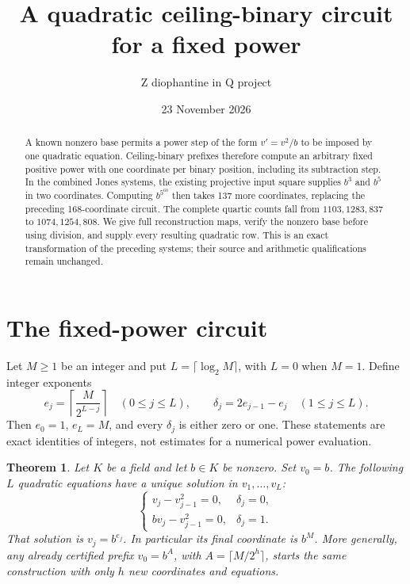 \documentclass[11pt]{article}
\title{A quadratic ceiling-binary circuit for a fixed power}
\author{Z diophantine in Q project}
\date{23 November 2026}
\newtheorem{theorem}{Theorem}
\begin{document}
\maketitle
\begin{abstract}
A known nonzero base permits a power step of the form
$v'=v^2/b$ to be imposed by one quadratic equation.  Ceiling-binary
prefixes therefore compute an arbitrary fixed positive power with one
coordinate per binary position, including its subtraction step.  In the
combined Jones systems, the existing projective input square supplies
$b^3$ and $b^5$ in two coordinates.  Computing $b^{5^{60}}$ then takes
137 more coordinates, replacing the preceding 168-coordinate circuit.
The complete quartic counts fall from $1103,1283,837$ to
$1074,1254,808$.  We give full reconstruction maps, verify the nonzero
base before using division, and supply every resulting quadratic row.
This is an exact transformation of the preceding systems; their source
and arithmetic qualifications remain unchanged.
\end{abstract}

\section{The fixed-power circuit}

Let $M\ge1$ be an integer and put $L=\lceil\log_2 M\rceil$, with
$L=0$ when $M=1$.  Define integer exponents
\[
 e_j=\left\lceil\frac{M}{2^{L-j}}\right\rceil
 \quad(0\le j\le L),\qquad
 \delta_j=2e_{j-1}-e_j\quad(1\le j\le L).
\]
Then $e_0=1$, $e_L=M$, and every $\delta_j$ is either zero or one.
These statements are exact identities of integers, not estimates for a
numerical power evaluation.

\begin{theorem}\label{thm:power}
Let $K$ be a field and let $b\in K$ be nonzero.  Set $v_0=b$.
The following $L$ quadratic equations have a unique solution in
$v_1,\ldots,v_L$:
\begin{equation}\label{eq:circuit}
 \begin{cases}
 v_j-v_{j-1}^2=0,&\delta_j=0,\\
 bv_j-v_{j-1}^2=0,&\delta_j=1.
 \end{cases}
\end{equation}
That solution is $v_j=b^{e_j}$.  In particular its final coordinate is
$b^M$.  More generally, any already certified prefix $v_0=b^A$, with
$A=\lceil M/2^h\rceil$, starts the same construction with only $h$
new coordinates and equations.
\end{theorem}
\end{document}
